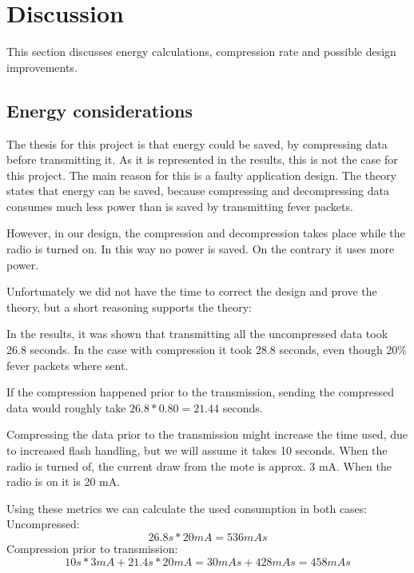 \chapter{Discussion}

This section discusses energy calculations, compression rate and possible design improvements.  

\section{Energy considerations}

The thesis for this project is that energy could be saved, by compressing data before transmitting it. As it is represented in the results, this is not the case for this project. The main reason for this is a faulty application design. 
The theory states that energy can be saved, because compressing and decompressing data consumes much less power than is saved by transmitting fever packets.

However, in our design, the compression and decompression takes place while the radio is turned on. In this way no power is saved. On the contrary it uses more power.

Unfortunately we did not have the time to correct the design and prove the theory, but a short reasoning supports the theory:

In the results, it was shown that transmitting all the uncompressed data took 26.8 seconds. 
In the case with compression it took 28.8 seconds, even though 20\% fever packets where sent. 

If the compression happened prior to the transmission, sending the compressed data would roughly take $26.8*0.80 = 21.44$ seconds. 

Compressing the data prior to the transmission might increase the time used, due to increased flash handling, but we will assume it takes 10 seconds.
When the radio is turned of, the current draw from the mote is approx. 3 mA. When the radio is on it is 20 mA. 

Using these metrics we can calculate the used consumption in both cases:\\
Uncompressed:
\begin{equation}
26.8 s * 20 mA = 536 mAs
\end{equation}
Compression prior to transmission:
\begin{equation}
10 s * 3 mA + 21.4 s * 20 mA = 30 mAs + 428 mAs  = 458 mAs
\end{equation}

